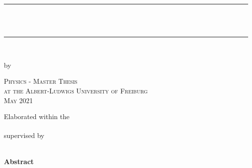 \newcommand{\HRule}{\rule{\linewidth}{0.2mm}}

\begin{titlepage}	
	\begin{center}

		\HRule \\[0.8cm]
		{ \huge \bfseries \vtitle}\\[0.4cm]
		\HRule \\[0.4cm]

		\vspace{10pt}

		{ \Large by \vauthor }

		\vspace{120pt}
		
		\textsc{\Large Physics - Master Thesis\\[0.5cm] 
			at the Albert-Ludwigs University of Freiburg\\[0.5cm]
			May 2021\\[0.5cm]}

		\vspace{100pt}	

		\Large{	Elaborated within the\\ 
			\vinstitute\\
			supervised by \\
 			\vsupervision\\}

	\end{center}
	\vspace{2cm}

\pagebreak
\mbox{}
\vspace{10pt}
\begin{center}
	\textbf{Abstract}\qquad
\end{center}
	\presummary

\end{titlepage}
